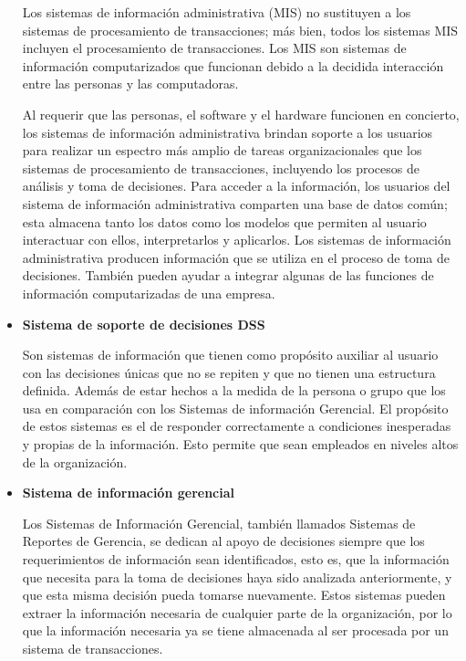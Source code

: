 \begin{itemize}
        Los sistemas de información administrativa (MIS) no sustituyen a los sistemas
        de procesamiento de transacciones; más bien, todos los sistemas MIS incluyen el
        procesamiento de transacciones\cite{kendall2005analisis}. Los MIS son sistemas
        de información computarizados que funcionan debido a la decidida interacción
        entre las personas y las computadoras.

        \vspace{1\baselineskip}
        Al requerir que las personas, el software y el hardware funcionen en concierto,
        los sistemas de información administrativa brindan soporte a los usuarios para
        realizar un espectro más amplio de tareas organizacionales que los sistemas de
        procesamiento de transacciones, incluyendo los procesos de análisis y toma de
        decisiones. Para acceder a la información, los usuarios del sistema de
        información administrativa comparten una base de datos común; esta almacena
        tanto los datos como los modelos que permiten al usuario interactuar con ellos,
        interpretarlos y aplicarlos. Los sistemas de información administrativa
        producen información que se utiliza en el proceso de toma de decisiones.
        También pueden ayudar a integrar algunas de las funciones de información
        computarizadas de una empresa.

  \item \textbf{Sistema de soporte de decisiones DSS}

        Son sistemas de información que tienen como propósito auxiliar al usuario con
        las decisiones únicas que no se repiten y que no tienen una estructura
        definida\cite{kendall2005analisis}. Además de estar hechos a la medida de la
        persona o grupo que los usa en comparación con los Sistemas de información
        Gerencial. El propósito de estos sistemas es el de responder correctamente a
        condiciones inesperadas y propias de la información. Esto permite que sean
        empleados en niveles altos de la organización.

  \item \textbf{Sistema de información gerencial}

        Los Sistemas de Información Gerencial, también llamados Sistemas de Reportes de
        Gerencia, se dedican al apoyo de decisiones siempre que los requerimientos de
        información sean identificados, esto es, que la información que necesita para
        la toma de decisiones haya sido analizada anteriormente, y que esta misma
        decisión pueda tomarse nuevamente\cite{kendall2005analisis}. Estos sistemas
        pueden extraer la información necesaria de cualquier parte de la organización,
        por lo que la información necesaria ya se tiene almacenada al ser procesada por
        un sistema de transacciones.


\end{itemize}
